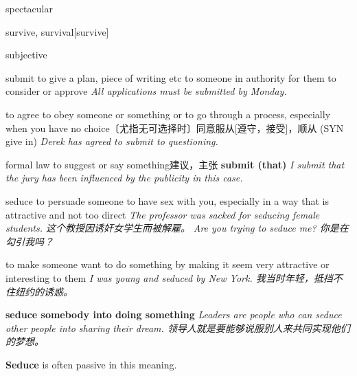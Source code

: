 \begin{DefWord}{spectacular}
\end{DefWord}

\begin{DefWord}{survive, survival}[survive]
\end{DefWord}

\begin{DefWord}{subjective}
\end{DefWord}

\begin{DefWord}{submit}
    to give a plan, piece of writing etc to someone in authority for them to consider or approve
    \textit{All applications must be submitted by Monday.}

    to agree to obey someone or something or to go through a process, especially when you have no choice〔尤指无可选择时〕同意服从[遵守，接受]，顺从 (SYN  give in)
    \textit{Derek has agreed to submit to questioning.}

    formal law to suggest or say something建议，主张
    \textbf{submit (that)}
    \textit{I submit that the jury has been influenced by the publicity in this case.}
\end{DefWord}

\begin{DefWord}{seduce}
    to persuade someone to have sex with you, especially in a way that is attractive and not too direct
    \textit{The professor was sacked for seducing female students. 这个教授因诱奸女学生而被解雇。 }
    \textit{Are you trying to seduce me? 你是在勾引我吗？}

    to make someone want to do something by making it seem very attractive or interesting to them
    \textit{I was young and seduced by New York. 我当时年轻，抵挡不住纽约的诱惑。 }

    \textbf{seduce somebody into doing something}
    \textit{Leaders are people who can seduce other people into sharing their dream. 领导人就是要能够说服别人来共同实现他们的梦想。 }

    \begin{remark}
        \textbf{Seduce} is often passive in this meaning.
    \end{remark}
\end{DefWord}